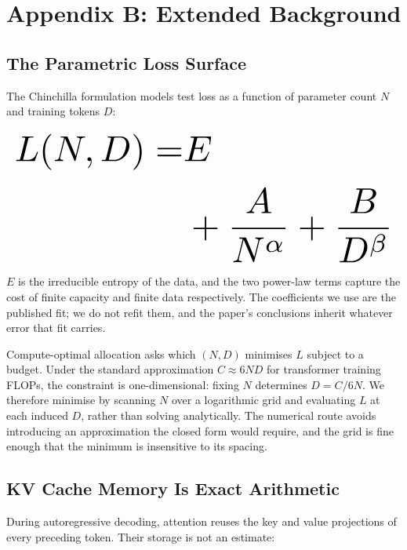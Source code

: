 \documentclass[10pt,twocolumn,letterpaper]{article}
\begin{document}
\section{Appendix B: Extended Background}



\subsection{The Parametric Loss Surface}


The Chinchilla formulation models test loss as a function of parameter count $N$ and training tokens $D$:








\begin{equation}
\resizebox{\columnwidth}{!}{$\displaystyle
\begin{aligned}
L(N, D) = & E \\
& + \frac{A}{N^{\alpha}} + \frac{B}{D^{\beta}}
\end{aligned}
$}
\end{equation}








$E$ is the irreducible entropy of the data, and the two power-law terms capture the cost of finite capacity and finite data respectively. The coefficients we use are the published fit; we do not refit them, and the paper's conclusions inherit whatever error that fit carries.

Compute-optimal allocation asks which $(N, D)$ minimises $L$ subject to a budget. Under the standard approximation $C \approx 6ND$ for transformer training FLOPs, the constraint is one-dimensional: fixing $N$ determines $D = C / 6N$. We therefore minimise by scanning $N$ over a logarithmic grid and evaluating $L$ at each induced $D$, rather than solving analytically. The numerical route avoids introducing an approximation the closed form would require, and the grid is fine enough that the minimum is insensitive to its spacing.


\subsection{KV Cache Memory Is Exact Arithmetic}


During autoregressive decoding, attention reuses the key and value projections of every preceding token. Their storage is not an estimate:
\end{document}
